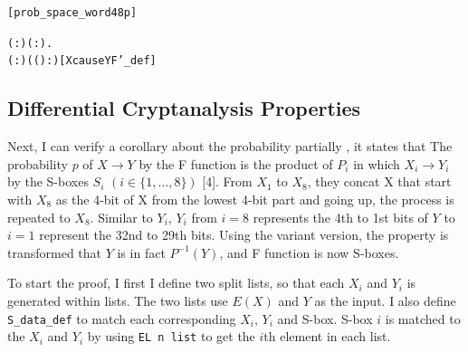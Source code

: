 \documentclass{article}
\begin{document}
\begin{alltt}
\HOLTokenTurnstile{}  \hfill{[prob_space_word48p]}
\end{alltt}

\begin{alltt}
\HOLTokenTurnstile{} \HOLSymConst{\HOLTokenForall{}}( :) ( :).
        \HOLSymConst{=}
      
       \HOLTokenLeftbrace{} \HOLTokenBar{} (  :) \HOLSymConst{\HOLTokenEor{}} ( ( \HOLSymConst{\HOLTokenEor{}}  ) :) \HOLSymConst{=} \HOLTokenRightbrace{}\hfill{[XcauseYF'_def]}
\end{alltt}

\subsection{Differential Cryptanalysis Properties}
Next, I can verify a corollary about the probability partially , it states that
The probability $p$ of $X \rightarrow Y$ by the F function is the product of $P_i$ in
which $X_i \rightarrow Y_i$ by the S-boxes $S_i$ $(i \in \{1, \dots, 8\})$ [4]. From $X_1$ to $X_8$, they concat X that
start with $X_8$ as the 4-bit of X from the lowest 4-bit part and going up, the process is repeated to $X_8$.
Similar to $Y_i$, $Y_i$ from $i=8$ represents the 4th to 1st bits of $Y$ to $i=1$ represent the 32nd to 29th bits.
Using the variant version, the property is transformed that $Y$ is in fact $P^{-1}(Y)$, and F function is now S-boxes.

To start the proof, I first I define two split lists, so that each $X_i$ and $Y_i$ is generated within lists. The two lists
use $E(X)$ and $Y$ as the input. I also define \verb|S_data_def| to match each corresponding $X_i$, $Y_i$ and S-box. S-box $i$
is matched to the $X_i$ and $Y_i$ by using \verb|EL n list| to get the $i$th element in each list.
\end{document}
